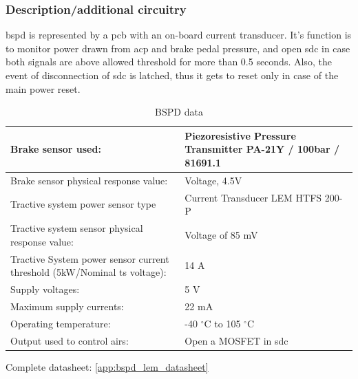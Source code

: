 
\subsubsection{Description/additional circuitry}

\Gls{bspd} is represented by a \gls{pcb} with an on-board current transducer. It’s function is to monitor
power drawn from \gls{acp} and brake pedal pressure, and open \gls{sdc} in case both signals are above
allowed threshold for more than 0.5 seconds. Also, the event of disconnection of \gls{sdc} is latched,
thus it gets to reset only in case of the main power reset.


\begin{table}[H]
	\centering
	\caption{BSPD data}
	\begin{tabularx}{\textwidth}{|X|X|}
		\hline
		Brake sensor used: & Piezoresistive Pressure Transmitter PA-21Y / 100bar / 81691.1 \\[\TableSize]
		\hline
		Brake sensor physical response value: & Voltage, 4.5V \\[\TableSize]
		\hline
		Tractive system power sensor type & Current Transducer LEM HTFS 200-P \\[\TableSize]
		\hline
		Tractive system sensor physical response value: & Voltage of 85 mV \\[\TableSize]
		\hline
		Tractive System power sensor current threshold (5kW/Nominal \gls{ts} voltage): & 14 A \\[\TableSize]
		\hline
		Supply voltages: & 5 V \\[\TableSize]
		\hline
		Maximum supply currents: & 22 mA \\[\TableSize]
		\hline
		Operating temperature: & -40 $^\circ$C to 105 $^\circ$C \\[\TableSize]
		\hline
		Output used to control \glspl{air}: & Open a MOSFET in \gls{sdc} \\[\TableSize]
		\hline
	\end{tabularx}%
	\label{tab:bspd}%
\end{table}%

Complete datasheet: \ref{app:bspd_lem_datasheet}

